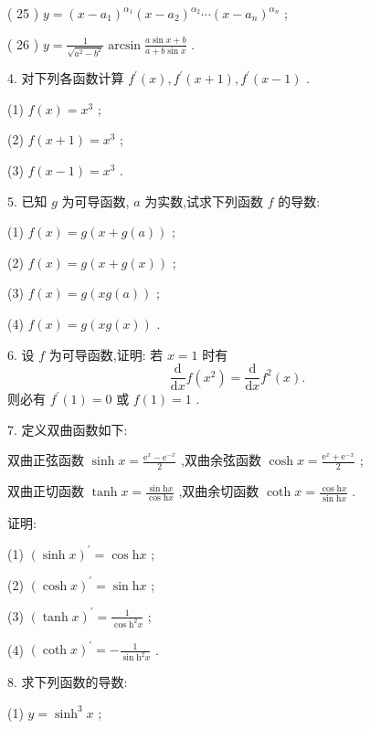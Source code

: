 ( 25 ) \(y = {\left( x - {a}_{1}\right) }^{{\alpha }_{1}}{\left( x - {a}_{2}\right) }^{{\alpha }_{2}}\cdots {\left( x - {a}_{n}\right) }^{{\alpha }_{n}}\) ;

( 26 ) \(y = \frac{1}{\sqrt{{a}^{2} - {b}^{2}}}\arcsin \frac{a\sin x + b}{a + b\sin x}\) .

4. 对下列各函数计算 \({f}^{\prime }\left( x\right) ,{f}^{\prime }\left( {x + 1}\right) ,{f}^{\prime }\left( {x - 1}\right)\) .

(1) \(f\left( x\right)  = {x}^{3}\) ;

(2) \(f\left( {x + 1}\right)  = {x}^{3}\) ;

(3) \(f\left( {x - 1}\right)  = {x}^{3}\) .

5. 已知 \(g\) 为可导函数, \(a\) 为实数,试求下列函数 \(f\) 的导数:

(1) \(f\left( x\right)  = g\left( {x + g\left( a\right) }\right)\) ;

(2) \(f\left( x\right)  = g\left( {x + g\left( x\right) }\right)\) ;

(3) \(f\left( x\right)  = g\left( {{xg}\left( a\right) }\right)\) ;

(4) \(f\left( x\right)  = g\left( {{xg}\left( x\right) }\right)\) .

6. 设 \(f\) 为可导函数,证明: 若 \(x = 1\) 时有
\[
\frac{\mathrm{d}}{\mathrm{d}x}f\left( {x}^{2}\right)  = \frac{\mathrm{d}}{\mathrm{d}x}{f}^{2}\left( x\right) .
\]
则必有 \({f}^{\prime }\left( 1\right)  = 0\) 或 \(f\left( 1\right)  = 1\) .

7. 定义双曲函数如下:

双曲正弦函数 \(\sinh x = \frac{{\mathrm{e}}^{x} - {\mathrm{e}}^{-x}}{2}\) ,双曲余弦函数 \(\cosh x = \frac{{\mathrm{e}}^{x} + {\mathrm{e}}^{-x}}{2}\) ;

双曲正切函数 \(\tanh x = \frac{\sin \mathrm{h}x}{\cos \mathrm{h}x}\) ,双曲余切函数 \(\coth x = \frac{\cos \mathrm{h}x}{\sin \mathrm{h}x}\) .

证明:

(1) \({\left( \sinh x\right) }^{\prime } = \cos \mathrm{h}x\) ;

(2) \({\left( \cosh x\right) }^{\prime } = \sin \mathrm{h}x\) ;

(3) \({\left( \tanh x\right) }^{\prime } = \frac{1}{\cos {\mathrm{h}}^{2}x}\) ;

(4) \({\left( \coth x\right) }^{\prime } =  - \frac{1}{\sin {\mathrm{h}}^{2}x}\) .

8. 求下列函数的导数:

(1) \(y = {\sinh }^{3}x\) ;

